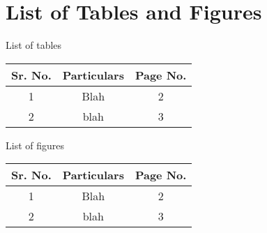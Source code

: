 \section{List of Tables and Figures} \label{sec:tabfig}

\vfill

\begin{table} [!h]
	\centering
List of tables \\
\vspace{5mm}
		\begin{tabular} {|c|c|c|} \hline
Sr. No. & Particulars & Page No. \\ \hline
1 & Blah & 2 \\
2 & blah & 3 \\ \hline
		\end{tabular}
			\label{tab:ListOfTables}
\end{table}

\vfill

\begin{table} [!h]
	\centering
List of figures \\
\vspace{5mm}
		\begin{tabular} {|c|c|c|} \hline
Sr. No. & Particulars & Page No. \\ \hline
1 & Blah & 2 \\
2 & blah & 3 \\ \hline
		\end{tabular}
			\label{tab:ListOfFigures}
\end{table}

\vfill
